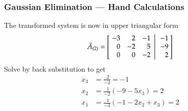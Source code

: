 \documentclass[10pt]{beamer}
\begin{document}
\begin{frame}
\frametitle{Gaussian Elimination --- Hand Calculations}

The transformed system is now in upper triangular form
\begin{equation*}
    \tilde{A}_{(2)} = \left[
           \left.\negthickspace\begin{array}{rrr}  -3 &  2 & -1 \\
                                                    0 & -2 &  5 \\
                                                    0 &  0 & -2 \end{array}
           \right|\begin{array}{r} -1 \\ -9 \\ 2 \end{array}\negthickspace\right]
\end{equation*}
Solve by back substitution to get
\begin{align*}
    x_3 &= \frac{\ \,2}{-2} = -1                             \\[10pt]
    x_2 &= \frac{\ \,1}{-2}\left(-9 -5x_3 \right) = 2        \\[10pt]
    x_1 &= \frac{\ \,1}{-3}\left(-1 -2x_2 + x_3 \right) = 2  \\[10pt]
\end{align*}


\end{frame}
\end{document}
